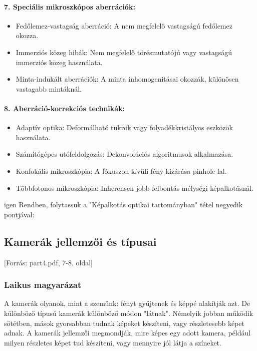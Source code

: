 \documentclass[a4paper,12pt]{article}
\begin{document}
\paragraph{7. Speciális mikroszkópos aberrációk:} \begin{itemize} \item Fedőlemez-vastagság aberráció: A nem megfelelő vastagságú fedőlemez okozza. \item Immerziós közeg hibák: Nem megfelelő törésmutatójú vagy vastagságú immerziós közeg használata. \item Minta-indukált aberrációk: A minta inhomogenitásai okozzák, különösen vastagabb mintáknál. \end{itemize}

\paragraph{8. Aberráció-korrekciós technikák:} \begin{itemize} \item Adaptív optika: Deformálható tükrök vagy folyadékkristályos eszközök használata. \item Számítógépes utófeldolgozás: Dekonvolúciós algoritmusok alkalmazása. \item Konfokális mikroszkópia: A fókuszon kívüli fény kizárása pinhole-lal. \item Többfotonos mikroszkópia: Inherensen jobb felbontás mélységi képalkotásnál. \end{itemize}

igen
Rendben, folytassuk a "Képalkotás optikai tartományban" tétel negyedik pontjával:

\subsection{Kamerák jellemzői és típusai} [Forrás: part4.pdf, 7-8. oldal]

\subsubsection{Laikus magyarázat} A kamerák olyanok, mint a szemünk: fényt gyűjtenek és képpé alakítják azt. De különböző típusú kamerák különböző módon "látnak". Némelyik jobban működik sötétben, mások gyorsabban tudnak képeket készíteni, vagy részletesebb képet adnak. A kamerák jellemzői megmondják, mire képes egy adott kamera, például milyen részletes képet tud készíteni, vagy mennyire jól látja a színeket.
\end{document}
